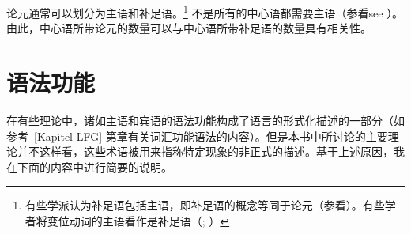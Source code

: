 论元通常可以划分为主语和补足语。\footnote{有些学派认为补足语包括主语，即补足语的概念等同于论元（参看\citealp[]{Gross2003a}）。有些学者将变位动词的主语看作是补足语（\citealp{Pollard90a-Eng}; \citealp[]{Eisenberg94b}）} 不是所有的中心语都需要主语（参看see \citealp[Section~3.2]{MuellerLehrbuch1}）。由此，中心语所带论元的数量可以与中心语所带补足语的数量具有相关性。

\largerpage
\section{语法功能}
\label{Abschnitt-GF}
在有些理论中，诸如主语和宾语的语法功能构成了语言的形式化描述的一部分（如参考~\ref{Kapitel-LFG} 第章有关词汇功能语法的内容）。但是本书中所讨论的主要理论并不这样看，这些术语被用来指称特定现象的非正式的描述。基于上述原因，我在下面的内容中进行简要的说明。

